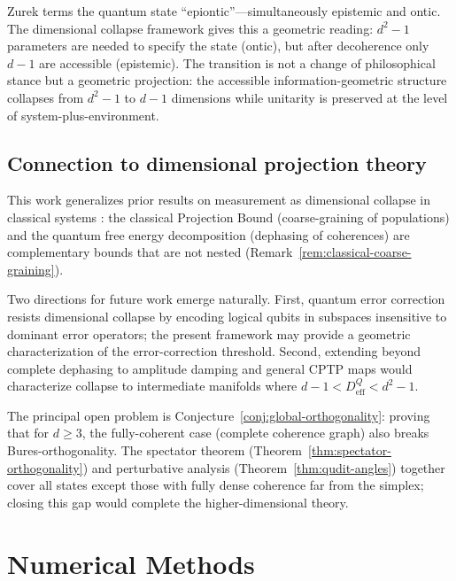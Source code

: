 \documentclass[12pt,a4paper]{article}
\theoremstyle{definition}
\theoremstyle{remark}
\begin{document}
Zurek \cite{zurek2025decoherence} terms the quantum state ``epiontic''---simultaneously epistemic and ontic.  The dimensional collapse framework gives this a geometric reading: $d^2 - 1$ parameters are needed to specify the state (ontic), but after decoherence only $d - 1$ are accessible (epistemic).  The transition is not a change of philosophical stance but a geometric projection: the accessible information-geometric structure collapses from $d^2 - 1$ to $d - 1$ dimensions while unitarity is preserved at the level of system-plus-environment.

\subsection{Connection to dimensional projection theory}
\label{sec:projection-theory}

This work generalizes prior results on measurement as dimensional collapse in classical systems \cite{todd2025falsifiability,todd2025timing}: the classical Projection Bound (coarse-graining of populations) and the quantum free energy decomposition (dephasing of coherences) are complementary bounds that are not nested (Remark~\ref{rem:classical-coarse-graining}).

Two directions for future work emerge naturally.  First, quantum error correction resists dimensional collapse by encoding logical qubits in subspaces insensitive to dominant error operators; the present framework may provide a geometric characterization of the error-correction threshold.  Second, extending beyond complete dephasing to amplitude damping and general CPTP maps would characterize collapse to intermediate manifolds where $d - 1 < D_{\mathrm{eff}}^Q < d^2 - 1$.

The principal open problem is Conjecture~\ref{conj:global-orthogonality}: proving that for $d \geq 3$, the fully-coherent case (complete coherence graph) also breaks Bures-orthogonality.  The spectator theorem (Theorem~\ref{thm:spectator-orthogonality}) and perturbative analysis (Theorem~\ref{thm:qudit-angles}) together cover all states except those with fully dense coherence far from the simplex; closing this gap would complete the higher-dimensional theory.




\appendix
\section{Numerical Methods}
\label{app:numerics}
\end{document}
